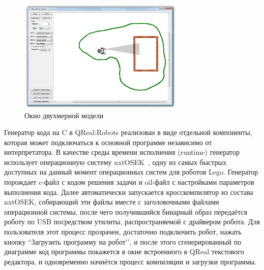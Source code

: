 \documentclass[a4paper]{article}
\begin{document}
\begin{figure} [ht]
  \begin{center}
    \includegraphics[width=0.7\textwidth]{2dModel.png}
    \caption{Окно двухмерной модели}
    \label{2dModel}
  \end{center}
\end{figure}

Генератор кода на C в QReal:Robots реализован в виде отдельной компоненты, которая может подключаться к основной программе независимо от интерпретатора. В качестве среды времени исполнения (runtime) генератор использует операционную систему nxtOSEK~\cite{nxtOsek}, одну из самых быстрых доступных на данный момент операционных систем для роботов Lego. Генератор порождает c-файл с кодом решения задачи и oil-файл с настройками параметров выполнения кода. Далее автоматически запускается кросскомпилятор из состава nxtOSEK, собирающий эти файлы вместе с заголовочными файлами операционной системы, после чего получившийся бинарный образ передаётся роботу по USB посредством утилиты, распространяемой с драйвером робота. Для пользователя этот процесс прозрачен, достаточно подключить робот, нажать кнопку ``Загрузить программу на робот’’, и после этого сгенерированный по диаграмме код программы покажется в окне встроенного в QReal текстового редактора, и одновременно начнётся процесс компиляции и загрузки программы.
\end{document}

